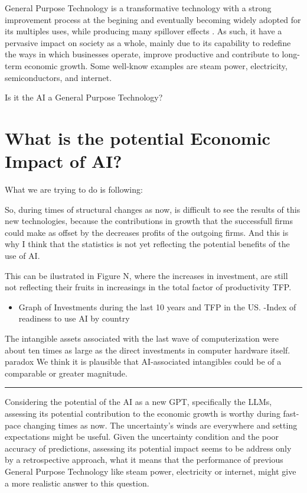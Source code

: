 \documentclass[preprint, 3p,
authoryear]{elsarticle} %
\providecommand{\tightlist}{%
  \setlength{\itemsep}{0pt}\setlength{\parskip}{0pt}}
\begin{document}
General Purpose Technology is a transformative technology with a strong
improvement process at the begining and eventually becoming widely
adopted for its multiples uses, while producing many spillover effects
\citep{paradox}. As such, it have a pervasive impact on society as a
whole, mainly due to its capability to redefine the ways in which
businesses operate, improve productive and contribute to long-term
economic growth. Some well-know examples are steam power, electricity,
semiconductors, and internet.

Is it the AI a General Purpose Technology?

\hypertarget{what-is-the-potential-economic-impact-of-ai}{%
\section{What is the potential Economic Impact of
AI?}\label{what-is-the-potential-economic-impact-of-ai}}

What we are trying to do is following:

So, during times of structural changes as now, is difficult to see the
results of this new technologies, because the contributions in growth
that the successfull firms could make as offset by the decreases profits
of the outgoing firms. And this is why I think that the statistics is
not yet reflecting the potential benefits of the use of AI.

This can be ilustrated in Figure N, where the increases in investment,
are still not reflecting their fruits in increasings in the total factor
of productivity TFP.

\begin{itemize}
\tightlist
\item
  Graph of Investments during the last 10 years and TFP in the US.
  -Index of readiness to use AI by country
\end{itemize}

The intangible assets associated with the last wave of computerization
were about ten times as large as the direct investments in computer
hardware itself. paradox We think it is plausible that AI-associated
intangibles could be of a comparable or greater magnitude.

\begin{center}\rule{0.5\linewidth}{0.5pt}\end{center}

Considering the potential of the AI as a new GPT, specifically the LLMs,
assessing its potential contribution to the economic growth is worthy
during fast-pace changing times as now. The uncertainty's winds are
everywhere and setting expectations might be useful. Given the
uncertainty condition and the poor accuracy of predictions, assessing
its potential impact seems to be address only by a retrospective
approach, what it means that the performance of previous General Purpose
Technology like steam power, electricity or internet, might give a more
realistic answer to this question.
\end{document}
